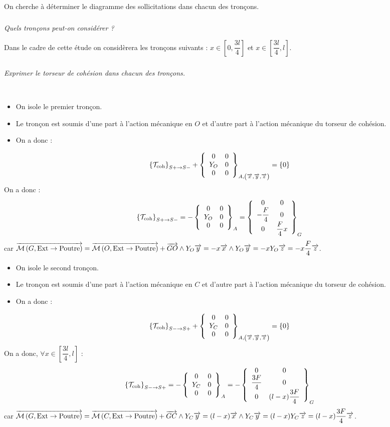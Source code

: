\documentclass[10pt,fleqn]{article} %
\begin{document}
\begin{multicols}{1}
\begin{corrige}
\end{corrige}
\else 
\fi
On cherche à déterminer le diagramme des sollicitations dans chacun des tronçons.

\subparagraph{}
\textit{Quels tronçons peut-on considérer ?}
\ifprof
\begin{corrige}
Dans le cadre de cette étude on considèrera les tronçons suivants : $x\in\left[0,\dfrac{3l}{4}\right]$ et $x\in\left[\dfrac{3l}{4},l\right]$.

\end{corrige}
\else 
\fi

\subparagraph{}
\textit{Exprimer le torseur de cohésion dans chacun des tronçons.}
\ifprof
\begin{corrige}~\\
\begin{itemize}[label=,font=\color{ocre}] 
\item On isole le premier tronçon.
\item Le tronçon est soumis d'une part à l'action mécanique en $O$ et d'autre part à l'action mécanique du torseur de cohésion.
\item On a donc :
\end{itemize}
$$
\torseurscoh_{S+\rightarrow S-} + \torseurcol{0}{Y_O}{0}{0}{0}{0}{A,\left( \vect{x},\vect{y},\vect{z} \right)} = \{0\}
$$
On a donc :
$$\torseurscoh_{S+\rightarrow S-}
=-\torseurcol{0}{Y_O}{0}{0}{0}{0}{A}
=\torseurcol{0}{-\dfrac{F}{4}}{0}{0}{0}{ \dfrac{F}{4}x}{G}
$$
car $\vectm{G}{\text{Ext}}{\text{Poutre}}=\vectm{O}{\text{Ext}}{\text{Poutre}} + \vect{GO}\wedge Y_O \vect{y}  = -x\vect{x} \wedge Y_O \vect{y} = -x Y_O \vect{z}= -x \dfrac{F}{4} \vect{z}$.

\begin{itemize}[label=,font=\color{ocre}] 
\item On isole le second tronçon.
\item Le tronçon est soumis d'une part à l'action mécanique en $C$ et d'autre part à l'action mécanique du torseur de cohésion.
\item On a donc :
\end{itemize}
$$
\torseurscoh_{S-\rightarrow S+} + \torseurcol{0}{Y_C}{0}{0}{0}{0}{A,\left( \vect{x},\vect{y},\vect{z} \right)} = \{0\}
$$
On a donc, $\forall x \in\left[\dfrac{3l}{4},l\right]$ :
$$
\torseurscoh_{S-\rightarrow S+}
=-\torseurcol{0}{Y_C}{0}{0}{0}{0}{A}
=-\torseurcol{0}{\dfrac{3F}{4}}{0}{0}{0}{ (l-x) \dfrac{3F}{4}}{G}
$$
car $\vectm{G}{\text{Ext}}{\text{Poutre}}=\vectm{C}{\text{Ext}}{\text{Poutre}} + \vect{GC}\wedge Y_C \vect{y}  = (l-x)\vect{x} \wedge Y_C \vect{y} = (l-x) Y_C \vect{z}= (l-x) \dfrac{3F}{4} \vect{z}$.


\end{corrige}
\end{multicols}
\end{document}
